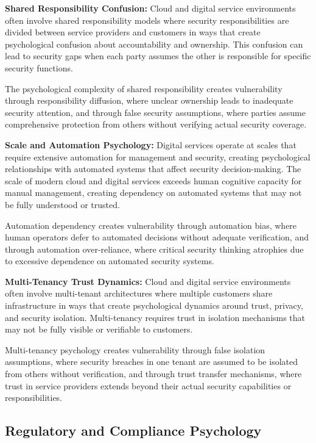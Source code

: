 \documentclass[10pt, twocolumn]{article}
\begin{document}
\textbf{Shared Responsibility Confusion:} Cloud and digital service environments often involve shared responsibility models where security responsibilities are divided between service providers and customers in ways that create psychological confusion about accountability and ownership. This confusion can lead to security gaps when each party assumes the other is responsible for specific security functions.

The psychological complexity of shared responsibility creates vulnerability through responsibility diffusion, where unclear ownership leads to inadequate security attention, and through false security assumptions, where parties assume comprehensive protection from others without verifying actual security coverage.

\textbf{Scale and Automation Psychology:} Digital services operate at scales that require extensive automation for management and security, creating psychological relationships with automated systems that affect security decision-making. The scale of modern cloud and digital services exceeds human cognitive capacity for manual management, creating dependency on automated systems that may not be fully understood or trusted.

Automation dependency creates vulnerability through automation bias, where human operators defer to automated decisions without adequate verification, and through automation over-reliance, where critical security thinking atrophies due to excessive dependence on automated security systems.

\textbf{Multi-Tenancy Trust Dynamics:} Cloud and digital service environments often involve multi-tenant architectures where multiple customers share infrastructure in ways that create psychological dynamics around trust, privacy, and security isolation. Multi-tenancy requires trust in isolation mechanisms that may not be fully visible or verifiable to customers.

Multi-tenancy psychology creates vulnerability through false isolation assumptions, where security breaches in one tenant are assumed to be isolated from others without verification, and through trust transfer mechanisms, where trust in service providers extends beyond their actual security capabilities or responsibilities.

\subsection{Regulatory and Compliance Psychology}
\end{document}
